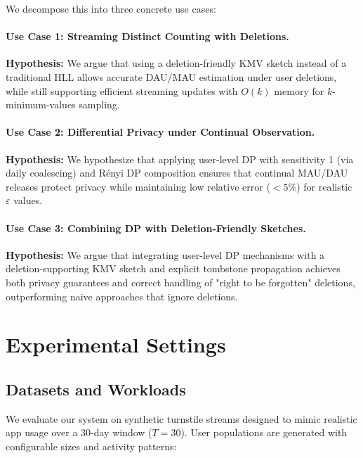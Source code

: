 \documentclass[11pt]{article}
\begin{document}
\vspace{0.5em}
We decompose this into three concrete use cases:

\paragraph{Use Case 1: Streaming Distinct Counting with Deletions.}
\textbf{Hypothesis:} We argue that using a deletion-friendly KMV sketch instead of a traditional HLL allows accurate DAU/MAU estimation under user deletions, while still supporting efficient streaming updates with $O(k)$ memory for $k$-minimum-values sampling.

\paragraph{Use Case 2: Differential Privacy under Continual Observation.}
\textbf{Hypothesis:} We hypothesize that applying user-level DP with sensitivity 1 (via daily coalescing) and Rényi DP composition ensures that continual MAU/DAU releases protect privacy while maintaining low relative error ($<5\%$) for realistic $\varepsilon$ values.

\paragraph{Use Case 3: Combining DP with Deletion-Friendly Sketches.}
\textbf{Hypothesis:} We argue that integrating user-level DP mechanisms with a deletion-supporting KMV sketch and explicit tombstone propagation achieves both privacy guarantees and correct handling of "right to be forgotten" deletions, outperforming naive approaches that ignore deletions.

\newpage
\section{Experimental Settings}

\subsection{Datasets and Workloads}

We evaluate our system on synthetic turnstile streams designed to mimic realistic app usage over a 30-day window ($T=30$). User populations are generated with configurable sizes and activity patterns:
\end{document}
